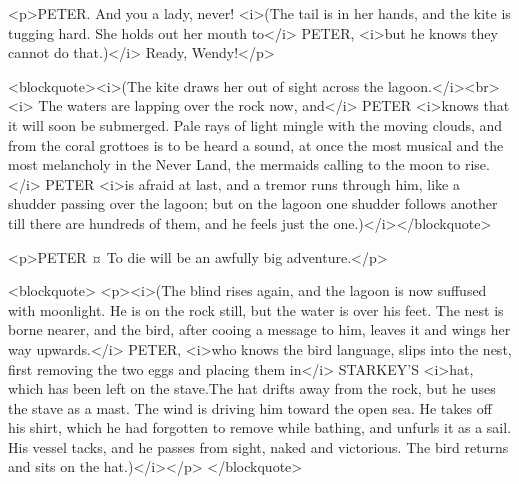 <p>PETER. And you a lady, never! <i>(The tail is in her hands, and the kite is tugging hard. She holds out her mouth to</i> PETER, <i>but he knows they cannot do that.)</i> Ready, Wendy!</p>

<blockquote><i>(The kite draws her out of sight across the lagoon.</i><br> <i> The waters are lapping over the rock now, and</i> PETER <i>knows that it will soon be submerged. Pale rays of light mingle with the moving clouds, and from the coral grottoes is to be heard a sound, at once the most musical and the most melancholy in the Never Land, the mermaids calling to the moon to rise.</i> PETER <i>is afraid at last, and a tremor runs through him, like a shudder passing over the lagoon; but on the lagoon one shudder follows another till there are hundreds of them, and he feels just the one.)</i></blockquote>

<p>PETER ¤
To die will be an awfully big adventure.</p>

<blockquote> <p><i>(The blind rises again, and the lagoon is now suffused with moonlight. He is on the rock still, but the water is over his feet. The nest is borne nearer, and the bird, after cooing a message to him, leaves it and wings her way upwards.</i> PETER, <i>who knows the bird language, slips into the nest, first removing the two eggs and placing them in</i> STARKEY'S <i>hat, which has been left on the stave.The hat drifts away from the rock, but he uses the stave as a mast. The wind is driving him toward the open sea. He takes off his shirt, which he had forgotten to remove while bathing, and unfurls it as a sail. His vessel tacks, and he passes from sight, naked and victorious. The bird returns and sits on the hat.)</i></p> </blockquote>
